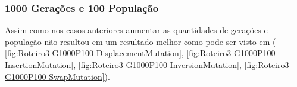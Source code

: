 \begin{center}
	\label{fig:Roteiro3-G500P50-SwapMutation}
\end{center}

\subsubsection{1000 Gerações e 100 População}

Assim como nos casos anteriores aumentar as quantidades de gerações e população não resultou em um resultado melhor como pode ser visto em ( \ref{fig:Roteiro3-G1000P100-DisplacementMutation},  \ref{fig:Roteiro3-G1000P100-InsertionMutation}, \ref{fig:Roteiro3-G1000P100-InversionMutation}, \ref{fig:Roteiro3-G1000P100-SwapMutation}).

